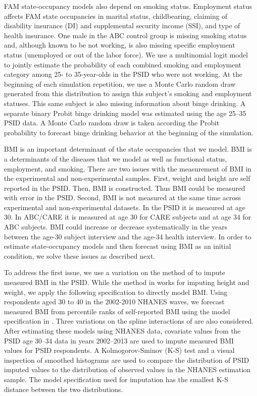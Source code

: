 \noindent FAM state-occupancy models also depend on smoking status. Employment status affects FAM state occupancies in marital status, childbearing, claiming of disability insurance (DI) and supplemental security income (SSI), and type of health insurance.
One male in the ABC control group is missing smoking status and, although known to be not working, is also missing specific employment status (unemployed or out of the labor force).
 We use a multinomial logit model to jointly estimate the probability of each combined smoking and employment category among 25- to 35-year-olds in the PSID who were not working. At the beginning of each simulation repetition, we use a Monte Carlo random draw generated from this distribution to assign this subject's smoking and employment statuses. This same subject is also missing information about binge drinking. A separate binary Probit binge drinking model was estimated using the age 25--35 PSID data. A Monte Carlo random draw is taken according the Probit probability to forecast binge drinking behavior at the beginning of the simulation.

\noindent BMI is an important determinant of the state occupancies that we model. BMI is a determinants of the diseases that we model as well as functional status, employment, and smoking. There are two issues with the measurement of BMI in the experimental and non-experimental samples. First, weight and height are self reported in the PSID. Then, BMI is constructed. Thus BMI could be measured with error in the PSID. Second, BMI is not measured at the same time across experimental and non-experimental datasets. In the PSID it is measured at age 30. In ABC/CARE it is measured at age 30 for CARE subjects and at age 34 for ABC subjects. BMI could increase or decrease systematically in the years between the age-30 subject interview and the age-34 health interview. In order to estimate state-occupancy models and then forecast using BMI as an initial condition, we solve these issues as described next.

\noindent To address the first issue, we use a variation on the method of \citet*{Courtemanche_etal_2015_Adjusting-Body-Mass} to impute measured BMI in the PSID.
While the method in \citet{Courtemanche_etal_2015_Adjusting-Body-Mass} works for imputing height and weight, we apply the following specification to directly model BMI. Using respondents aged 30 to 40 in the 2002-2010 NHANES waves, we forecast measured BMI from percentile ranks of self-reported BMI using the model specification in \citet{Courtemanche_etal_2015_Adjusting-Body-Mass}. Three variations
on the spline interactions of \citet{Courtemanche_etal_2015_Adjusting-Body-Mass} are also considered. After estimating these models using NHANES data, covariate values from the PSID
age 30--34 data in years 2002--2013 are used to impute measured BMI values for PSID respondents. A Kolmogorov-Sminov (K-S) test and a visual inspection of smoothed histograms are used to compare the distribution of PSID imputed values to the distribution of observed values in the NHANES estimation sample. The model specification used for imputation has the smallest K-S distance between the two distributions.

